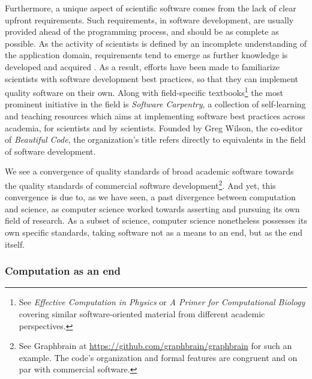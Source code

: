 Furthermore, a unique aspect of scientific software comes from the lack of clear upfront requirements. Such requirements, in software development, are usually provided ahead of the programming process, and should be as complete as possible. As the activity of scientists is defined by an incomplete understanding of the application domain, requirements tend to emerge as further knowledge is developed and acquired \citep{segal_when_2005}. As a result, efforts have been made to familiarize scientists with software development best practices, so that they can implement quality software on their own. Along with field-specific textbooks\footnote{See \emph{Effective Computation in Physics} \citep{scopatz_effective_2015} or \emph{A Primer for Computational Biology} \citep{oneil_primer_2019} covering similar software-oriented material from different academic perspectives.} the most prominent initiative in the field is \emph{Software Carpentry}, a collection of self-learning and teaching resources which aims at implementing software best practices across academia, for scientists and by scientists. Founded by Greg Wilson, the co-editor of \emph{Beautiful Code}, the organization's title refers directly to equivalents in the field of software development.

We see a convergence of quality standards of broad academic software towards the quality standards of commercial software development\footnote{See Graphbrain at \url{https://github.com/graphbrain/graphbrain} for such an example. The code's organization and formal features are congruent and on par with commercial software.}.  And yet, this convergence is due to, as we have seen, a past divergence between computation and science, as computer science worked towards asserting and pursuing its own field of research. As a subset of science, computer science nonetheless possesses its own specific standards, taking software not as a means to an end, but as the end itself.

\vspace{1\baselineskip}

\subsubsection{Computation as an end}

